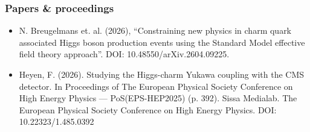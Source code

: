 \documentclass[a4paper]{book}
\begin{document}
\subsubsection{Papers \& proceedings}
\begin{itemize}
  \item  N. Breugelmans et. al. (2026), “Constraining new physics in charm quark associated Higgs boson production events using the Standard Model effective field theory approach”. 	DOI: 10.48550/arXiv.2604.09225.
  \item  Heyen, F. (2026). Studying the Higgs-charm Yukawa coupling with the CMS detector. In Proceedings of The European Physical Society Conference on High Energy Physics — PoS(EPS-HEP2025) (p. 392). Sissa Medialab. The European Physical Society Conference on High Energy Physics. DOI: 10.22323/1.485.0392
\end{itemize}
\tableofcontents

\mainmatter%







\backmatter%


\printbibliography[heading=bibintoc]

\appendix
\renewcommand{\thesection}{\Alph{section}}

\end{document}
